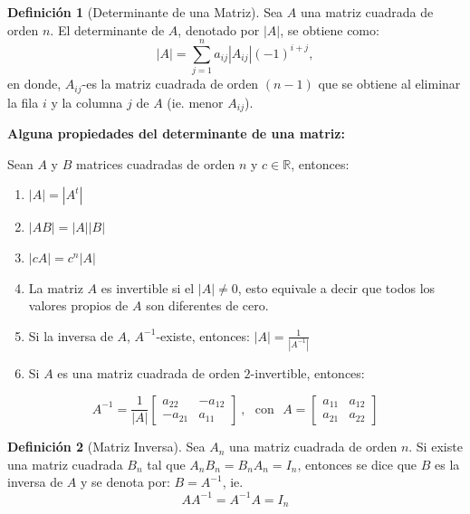 \documentclass[
]{book}
\theoremstyle{definition}
\newtheorem{definition}{Definición}[chapter]
\theoremstyle{definition}
\theoremstyle{definition}
\theoremstyle{definition}
\theoremstyle{remark}
\begin{document}
\begin{definition}[Determinante de una Matriz]
\protect\hypertarget{def:determ-matriz}{}\label{def:determ-matriz}Sea \(A\) una matriz cuadrada de orden \(n\). El determinante de \(A\), denotado por \(|A|\), se obtiene como:
\[
|A|=\sum_{j=1}^n a_{ij}|A_{ij}|(-1)^{i+j},
\]
en donde, \(A_{ij}\)-es la matriz cuadrada de orden \((n-1)\) que se obtiene al eliminar la fila \(i\) y la columna \(j\) de \(A\) (ie. menor \(A_{ij}\)).
\end{definition}

\textbf{Alguna propiedades del determinante de una matriz:}

Sean \(A\) y \(B\) matrices cuadradas de orden \(n\) y \(c\in \mathbb{R}\), entonces:

\begin{enumerate}
\def\labelenumi{\alph{enumi}.}
\item
  \(|A|=|A^t|\)
\item
  \(|AB|=|A||B|\)
\item
  \(|c A|=c^n|A|\)
\item
  La matriz \(A\) es invertible si el \(|A|\neq 0\), esto equivale a decir que todos los valores propios de \(A\) son diferentes de cero.
\item
  Si la inversa de \(A\), \(A^{-1}\)-existe, entonces: \(|A| =\frac{1}{|A^{-1}|}\)
\item
  Si \(A\) es una matriz cuadrada de orden \(2\)-invertible, entonces:
\end{enumerate}

\[
A^{-1}=\frac{1}{|A|}\begin{bmatrix}
                a_{22} & -a_{12}\\
                -a_{21} & a_{11}
                \end{bmatrix}\ , \ \ \ \text{con}\ \ \ A=\begin{bmatrix}
                a_{11} & a_{12}\\
                a_{21} & a_{22}
                \end{bmatrix}
\]

\begin{definition}[Matriz Inversa]
\protect\hypertarget{def:matriz-inversa}{}\label{def:matriz-inversa}Sea \(A_n\) una matriz cuadrada de orden \(n\). Si existe una matriz cuadrada \(B_n\) tal que \(A_n B_n=B_nA_n=I_n\), entonces se dice que \(B\) es la inversa de \(A\) y se denota por: \(B=A^{-1}\), ie.
\[
AA^{-1}=A^{-1}A=I_n
\]
\end{definition}
\end{document}
